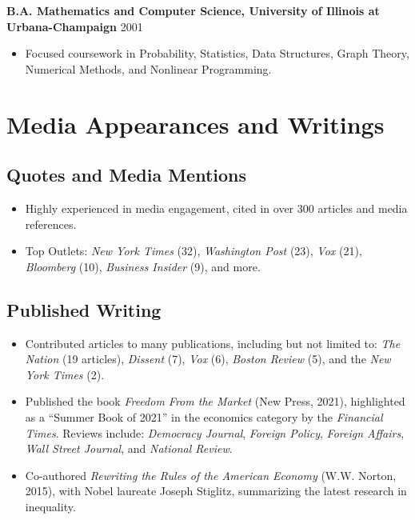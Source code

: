 \documentclass[11pt,]{article}
\providecommand{\tightlist}{%
  \setlength{\itemsep}{0pt}\setlength{\parskip}{0pt}}
\begin{document}
\textbf{B.A. Mathematics and Computer Science, University of Illinois at
Urbana-Champaign} \hfill 2001

\begin{itemize}
\tightlist
\item
  Focused coursework in Probability, Statistics, Data Structures, Graph
  Theory, Numerical Methods, and Nonlinear Programming.
\end{itemize}

\section{Media Appearances and
Writings}\label{media-appearances-and-writings}

\subsection{Quotes and Media Mentions}\label{quotes-and-media-mentions}

\begin{itemize}
\tightlist
\item
  Highly experienced in media engagement, cited in over 300 articles and
  media references.
\item
  Top Outlets: \emph{New York Times} (32), \emph{Washington Post} (23),
  \emph{Vox} (21), \emph{Bloomberg} (10), \emph{Business Insider} (9),
  and more.
\end{itemize}

\subsection{Published Writing}\label{published-writing}

\begin{itemize}
\tightlist
\item
  Contributed articles to many publications, including but not limited
  to: \emph{The Nation} (19 articles), \emph{Dissent} (7), \emph{Vox}
  (6), \emph{Boston Review} (5), and the \emph{New York Times} (2).
\item
  Published the book \emph{Freedom From the Market} (New Press, 2021),
  highlighted as a ``Summer Book of 2021'' in the economics category by
  the \emph{Financial Times}. Reviews include: \emph{Democracy Journal},
  \emph{Foreign Policy}, \emph{Foreign Affairs}, \emph{Wall Street
  Journal}, and \emph{National Review}.
\item
  Co-authored \emph{Rewriting the Rules of the American Economy} (W.W.
  Norton, 2015), with Nobel laureate Joseph Stiglitz, summarizing the
  latest research in inequality.
\end{itemize}
\end{document}
